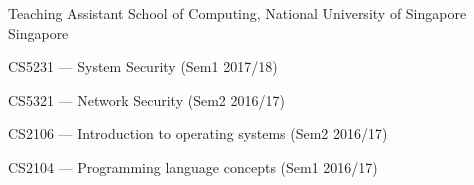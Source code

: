 


\begin{cventries}
  \cventry
    {Teaching Assistant} %
    {School of Computing, National University of Singapore} %
    {Singapore} %
    {}
    {
      \begin{cvitems} %
        \item CS5231 --- System Security (Sem1 2017/18)
        \item CS5321 --- Network Security (Sem2 2016/17)
        \item CS2106 --- Introduction to operating systems (Sem2 2016/17)
        \item CS2104 --- Programming language concepts (Sem1 2016/17)
      \end{cvitems}
    }




\end{cventries}
